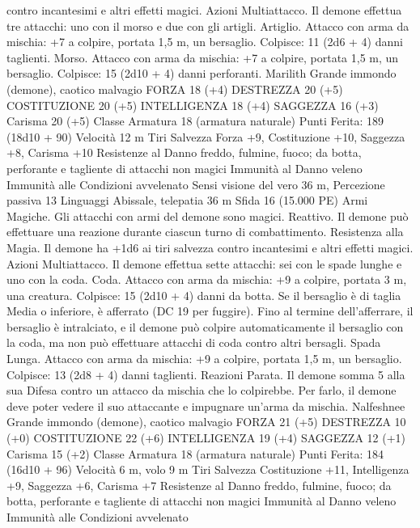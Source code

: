 \begin{multicols}{2}
contro incantesimi e altri effetti magici.
Azioni
Multiattacco. Il demone effettua tre attacchi: uno con il morso e
due con gli artigli.
Artiglio. Attacco con arma da mischia: +7 a colpire, portata 1,5
m, un bersaglio.
Colpisce: 11 (2d6 + 4) danni taglienti.
Morso. Attacco con arma da mischia: +7 a colpire, portata 1,5
m, un bersaglio.
Colpisce: 15 (2d10 + 4) danni perforanti. 
Marilith
Grande immondo (demone), caotico malvagio
FORZA 18 (+4)
DESTREZZA 20 (+5)
COSTITUZIONE 20 (+5)
INTELLIGENZA 18 (+4)
SAGGEZZA 16 (+3)
Carisma 20 (+5)
Classe Armatura 18 (armatura naturale)
\hspace*{0pt}\hfill{Punti Ferita}: 189 (18d10 + 90)
Velocità 12 m
Tiri Salvezza Forza +9, Costituzione +10, Saggezza +8, Carisma
+10
Resistenze al Danno freddo, fulmine, fuoco; da botta,
perforante e tagliente di attacchi non magici
Immunità al Danno veleno
Immunità alle Condizioni avvelenato
Sensi visione del vero 36 m, Percezione passiva 13
Linguaggi Abissale, telepatia 36 m
Sfida 16 (15.000 PE)
Armi Magiche. Gli attacchi con armi del demone sono magici.
Reattivo. Il demone può effettuare una reazione durante ciascun
turno di combattimento.
Resistenza alla Magia. Il demone ha +1d6 ai tiri salvezza
contro incantesimi e altri effetti magici.
Azioni
Multiattacco. Il demone effettua sette attacchi: sei con le spade
lunghe e uno con la coda.
Coda. Attacco con arma da mischia: +9 a colpire, portata 3 m,
una creatura.
Colpisce: 15 (2d10 + 4) danni da botta. Se il bersaglio è di
taglia Media o inferiore, è afferrato (DC 19 per fuggire). Fino al
termine dell’afferrare, il bersaglio è intralciato, e il demone può
colpire automaticamente il bersaglio con la coda, ma non può
effettuare attacchi di coda contro altri bersagli.
Spada Lunga. Attacco con arma da mischia: +9 a colpire,
portata 1,5 m, un bersaglio.
Colpisce: 13 (2d8 + 4) danni taglienti.
Reazioni
Parata. Il demone somma 5 alla sua Difesa contro un attacco da
mischia che lo colpirebbe. Per farlo, il demone deve poter vedere
il suo attaccante e impugnare un’arma da mischia.
Nalfeshnee
Grande immondo (demone), caotico malvagio
FORZA 21 (+5)
DESTREZZA 10 (+0)
COSTITUZIONE 22 (+6)
INTELLIGENZA 19 (+4)
SAGGEZZA 12 (+1)
Carisma 15 (+2)
Classe Armatura 18 (armatura naturale)
\hspace*{0pt}\hfill{Punti Ferita}: 184 (16d10 + 96)
Velocità 6 m, volo 9 m
Tiri Salvezza Costituzione +11, Intelligenza +9, Saggezza +6,
Carisma +7
Resistenze al Danno freddo, fulmine, fuoco; da botta,
perforante e tagliente di attacchi non magici
Immunità al Danno veleno
Immunità alle Condizioni avvelenato

\end{multicols}
